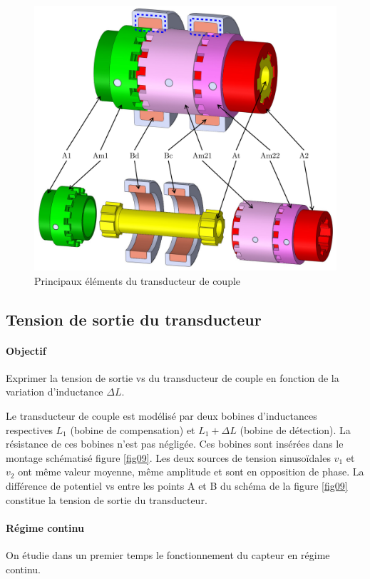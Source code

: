 \begin{figure}[ht!]
\begin{center}
\includegraphics[width=.5\linewidth]{img/fig08}
\caption{\label{fig08}Principaux éléments du transducteur de couple}
\end{center}
\end{figure}

\subsection{Tension de sortie du transducteur}

\paragraph{Objectif} Exprimer la tension de sortie vs du transducteur de couple en fonction de la variation d'inductance $\Delta L$.

Le transducteur de couple est modélisé par deux bobines d'inductances respectives $L_1$ (bobine de compensation) et $L_1 + \Delta L$ (bobine de détection). La résistance de ces bobines n'est pas négligée. Ces bobines sont insérées dans le montage schématisé figure \ref{fig09}. Les deux sources de tension sinusoïdales $v_1$ et $v_2$ ont même valeur moyenne, même amplitude et sont en opposition de phase. La différence de potentiel vs entre les points A et B du schéma de la figure \ref{fig09} constitue la tension de sortie du transducteur.

\paragraph{Régime continu} On étudie dans un premier temps le fonctionnement du capteur en régime continu.


